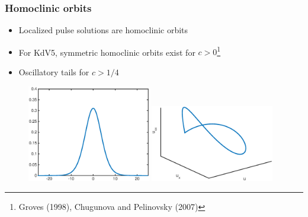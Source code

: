 \documentclass[16pt]{beamer}
\begin{document}
\begin{frame}
	\frametitle{Homoclinic orbits}

	\begin{itemize}
		\item Localized pulse solutions are homoclinic orbits
		\item For KdV5, symmetric homoclinic orbits exist for $c > 0$\footnote{Groves (1998), Chugunova and Pelinovsky (2007)}
		\item Oscillatory tails for $c > 1/4$
	\end{itemize}

	\begin{figure}
   		\includegraphics[width=0.48\textwidth]{images/exactsol}
   		\includegraphics[width=0.48\textwidth]{images/exactsolorbit}
	\end{figure}
\end{frame}
\end{document}
